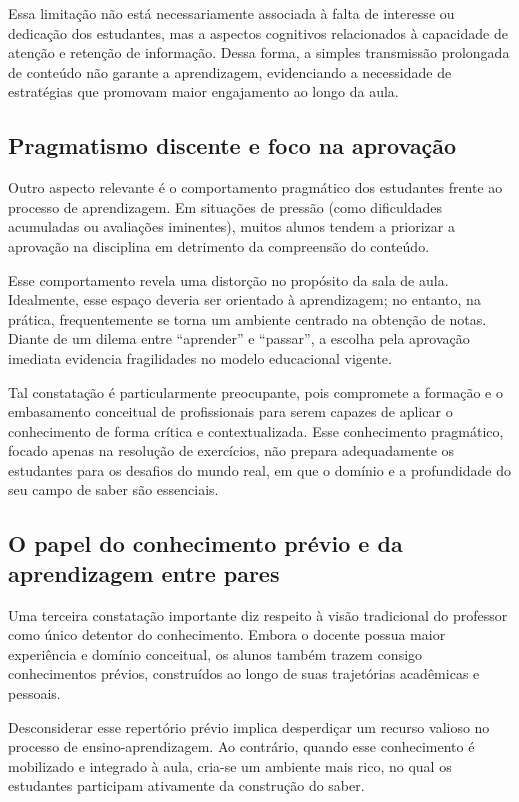 Essa limitação não está necessariamente associada à falta de interesse ou dedicação dos estudantes, mas a aspectos cognitivos relacionados à capacidade de atenção e retenção de informação. Dessa forma, a simples transmissão prolongada de conteúdo não garante a aprendizagem, evidenciando a necessidade de estratégias que promovam maior engajamento ao longo da aula.

\subsection{Pragmatismo discente e foco na aprovação}

Outro aspecto relevante é o comportamento pragmático dos estudantes frente ao processo de aprendizagem. Em situações de pressão (como dificuldades acumuladas ou avaliações iminentes), muitos alunos tendem a priorizar a aprovação na disciplina em detrimento da compreensão do conteúdo.

Esse comportamento revela uma distorção no propósito da sala de aula. Idealmente, esse espaço deveria ser orientado à aprendizagem; no entanto, na prática, frequentemente se torna um ambiente centrado na obtenção de notas. Diante de um dilema entre “aprender” e “passar”, a escolha pela aprovação imediata evidencia fragilidades no modelo educacional vigente.

Tal constatação é particularmente preocupante, pois compromete a formação e o embasamento conceitual de profissionais para serem capazes de aplicar o conhecimento de forma crítica e contextualizada. Esse conhecimento pragmático, focado apenas na resolução de exercícios, não prepara adequadamente os estudantes para os desafios do mundo real, em que o domínio e a profundidade do seu campo de saber são essenciais.

\subsection{O papel do conhecimento prévio e da aprendizagem entre pares}

Uma terceira constatação importante diz respeito à visão tradicional do professor como único detentor do conhecimento. Embora o docente possua maior experiência e domínio conceitual, os alunos também trazem consigo conhecimentos prévios, construídos ao longo de suas trajetórias acadêmicas e pessoais.

Desconsiderar esse repertório prévio implica desperdiçar um recurso valioso no processo de ensino-aprendizagem. Ao contrário, quando esse conhecimento é mobilizado e integrado à aula, cria-se um ambiente mais rico, no qual os estudantes participam ativamente da construção do saber.

